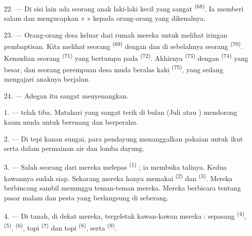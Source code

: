 22. --- Di sisi lain ada seorang anak laki-laki kecil yang sangat
 \textsuperscript{(68)}. Ia memberi salam dan mengucapkan
«  » kepada orang-orang yang dikenalnya.

23. --- Orang-orang desa keluar dari rumah mereka untuk melihat
iringan pembaptisan. Kita melihat seorang 
\textsuperscript{(69)} dengan  dan di sebelahnya
seorang  \textsuperscript{(70)}. Kemudian
seorang  \textsuperscript{(71)} yang bertumpu
pada  \textsuperscript{(72)}. Akhirnya
 \textsuperscript{(73)} dengan  \textsuperscript{(74)} yang besar, dan seorang perempuan desa
muda beralas kaki  \textsuperscript{(75)}, yang
sedang mengajari anaknya berjalan.

24. --- Adegan itu sangat menyenangkan.

\VUsaut{4.0mm}
\VUsaut{3.0mm}

\VUsaut{2.4mm}

\VUsaut{3.0mm}

1. ---  telah tiba. Matahari yang sangat terik di
bulan  (Juli atau ) mendorong kaum muda
untuk berenang dan berperahu.

2. --- Di tepi kanan sungai, para pendayung menanggalkan pakaian
untuk ikut serta dalam permainan air dan lomba dayung.

3. --- Salah seorang dari mereka melepas 
\textsuperscript{(1)} ; ia membuka talinya. Kedua kawannya sudah siap.
Sekarang mereka hanya memakai 
\textsuperscript{(2)} dan  \textsuperscript{(3)}.
Mereka berbincang sambil menunggu teman-teman mereka. Mereka
berbicara tentang pasar malam dan pesta yang berlangsung di seberang.

4. --- Di tanah, di dekat mereka, tergeletak 
kawan-kawan mereka : sepasang  \textsuperscript{(4)},
 \textsuperscript{(5)}, 
\textsuperscript{(6)}, topi  \textsuperscript{(7)} dan
topi  \textsuperscript{(8)}, serta 
\textsuperscript{(9)}.

